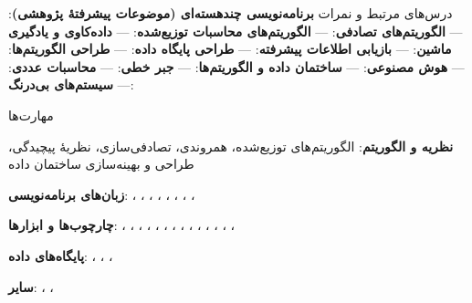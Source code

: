 \documentclass[11pt]{article}
\begin{document}
\begin{faSection}{درس‌های مرتبط و نمرات}
\textbf{برنامه‌نویسی چندهسته‌ای (موضوعات پیشرفتۀ پژوهشی)}:  --- \textbf{الگوریتم‌های تصادفی}:  --- \textbf{الگوریتم‌های محاسبات توزیع‌شده}:  --- \textbf{داده‌کاوی و یادگیری ماشین}:  --- \textbf{بازیابی اطلاعات پیشرفته}:  --- \textbf{طراحی پایگاه داده}:  --- \textbf{طراحی الگوریتم‌ها}:  --- \textbf{هوش مصنوعی}:  --- \textbf{ساختمان داده و الگوریتم‌ها}:  --- \textbf{جبر خطی}:  --- \textbf{محاسبات عددی}:  --- \textbf{سیستم‌های بی‌درنگ}: 
\end{faSection}

\begin{faSection}{مهارت‌ها}

\textbf{نظریه و الگوریتم}: الگوریتم‌های توزیع‌شده، همروندی، تصادفی‌سازی، نظریۀ پیچیدگی، طراحی و بهینه‌سازی ساختمان داده

\vspace{0.3em}
\textbf{زبان‌های برنامه‌نویسی}: ، ، ، ، ، ، ، ، 

\vspace{0.3em}
\textbf{چارچوب‌ها و ابزارها}: ، ، ، ، ، ، ، ، ، ، ، ، ، ، 

\vspace{0.3em}
\textbf{پایگاه‌های داده}: ، ، ، 

\vspace{0.3em}
\textbf{سایر}: ، ، 

\end{faSection}
\end{document}
